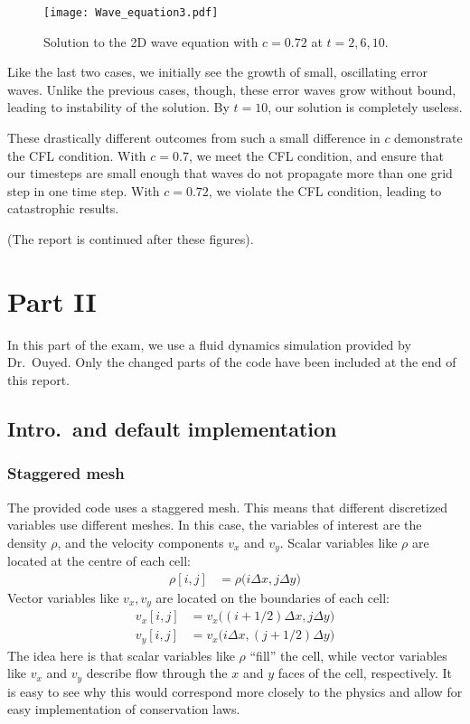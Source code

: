 \documentclass[twocolumn]{myarticle}
\numberwithin{equation}{section}
\begin{document}
\begin{figure*}[ht]
    \centering
    \texttt{[image: Wave\_equation3.pdf]}
    \caption{Solution to the 2D wave equation with $ c = 0.72 $ at $ t = 2, 6, 10 $.}
    \label{fig:wave_equation3}
\end{figure*}

Like the last two cases, we initially see the growth of small, oscillating error waves.
Unlike the previous cases, though, these error waves grow without bound, leading to instability of the solution.
By $ t = 10 $, our solution is completely useless.

These drastically different outcomes from such a small difference in $ c $ demonstrate the CFL condition.
With $ c = 0.7 $, we meet the CFL condition, and ensure that our timesteps are small enough that waves do not propagate more than one grid step in one time step.
With $ c = 0.72 $, we violate the CFL condition, leading to catastrophic results.

(The report is continued after these figures).

\clearpage

\section{Part II}
\label{sec:part_ii}

In this part of the exam, we use a fluid dynamics simulation provided by Dr.\ Ouyed.
Only the changed parts of the code have been included at the end of this report.

\subsection{Intro.\ and default implementation}
\label{subsec:intro_and_default_implementation}

\subsubsection{Staggered mesh}
\label{subsubsec:staggered_mesh}

The provided code uses a staggered mesh.
This means that different discretized variables use different meshes.
In this case, the variables of interest are the density $ \rho $, and the velocity components $ v_x $ and $ v_y $.
Scalar variables like $ \rho $ are located at the centre of each cell:
\begin{align}
    \rho[i,j] &= \rho\big(i \Delta x, j \Delta y\big)
\end{align}
Vector variables like $ v_x, v_y $ are located on the boundaries of each cell:
\begin{align}
    v_x[i,j] &= v_x\big((i+1/2) \Delta x, j \Delta y \big)
    \\
    v_y[i,j] &= v_x\big(i \Delta x, (j+1/2) \Delta y \big)
\end{align}
The idea here is that scalar variables like $ \rho $ ``fill'' the cell, while vector variables like $ v_x $ and $ v_y $ describe flow through the $ x $ and $ y $ faces of the cell, respectively.
It is easy to see why this would correspond more closely to the physics and allow for easy implementation of conservation laws.
\end{document}
